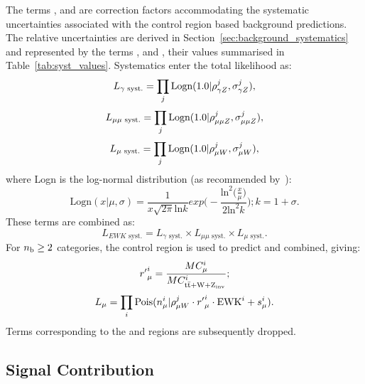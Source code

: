The terms \rhopz, \rhommz and \rhomw are correction factors accommodating the
systematic uncertainties associated with the control region based background 
predictions. The relative uncertainties are derived in
Section~\ref{sec:background_systematics} and represented by the terms \sigmapz, \sigmammz
and \sigmamw, their 
values summarised in Table~\ref{tab:syst_values}. Systematics enter the total
likelihood as:
% 
\begin{equation}
L_{\gamma\text{ syst.}} = \prod_j \text{Logn}(1.0 | \rho^j_{\gamma Z}, \sigma^j_{\gamma Z}),
\end{equation}
\begin{equation}
L_{\mu\mu\text{ syst.}} = \prod_j \text{Logn}(1.0 | \rho^j_{\mu\mu Z}, \sigma^j_{\mu\mu Z}),
\end{equation}
\begin{equation}
L_{\mu\text{ syst.}} = \prod_j \text{Logn}(1.0 | \rho^j_{\mu W}, \sigma^j_{\mu W}),
\end{equation}
% 
where Logn is the log-normal distribution (as recommended by~\cite{cousins-log-normal}):
% 
\begin{equation}
\text{Logn}(x|\mu, \sigma) = \frac{1}{x\sqrt{2\pi}\text{ln}k} exp \Bigg(-\frac{\text{ln}^2 \big(\frac{x}{\mu}\big)}{2\text{ln}^2k}\Bigg); \xspace k = 1+\sigma .
\end{equation}
% 
These terms are combined as:
% 
\begin{equation}
L_{EWK\text{ syst.}} = L_{\gamma\text{ syst.}} \times L_{\mu\mu\text{ syst.}} \times L_{\mu\text{ syst.}}.
\end{equation}
% 
For $n_{\text{b}} \geq 2$ categories, the \mj control region is used to predict \zinv and
\ttw combined, giving:
% 
\begin{equation}
{r'}^i_{\mu} = \frac{MC_{\mu}^i}{MC^i_{\rm{t}\bar{\rm{t}} + W + \text{Z}_{\text{inv}}}};
\end{equation}
% 
\begin{equation}
L_{\mu} = \prod_i \text{Pois}(n_{\mu}^i | \rho^j_{\mu W} \cdot {r'}_{\mu}^i \cdot \text{EWK}^i + s_{\mu}^i).
\end{equation}
% 
Terms corresponding to the \mmj and \gj regions are subsequently dropped.

\subsection{Signal Contribution}

